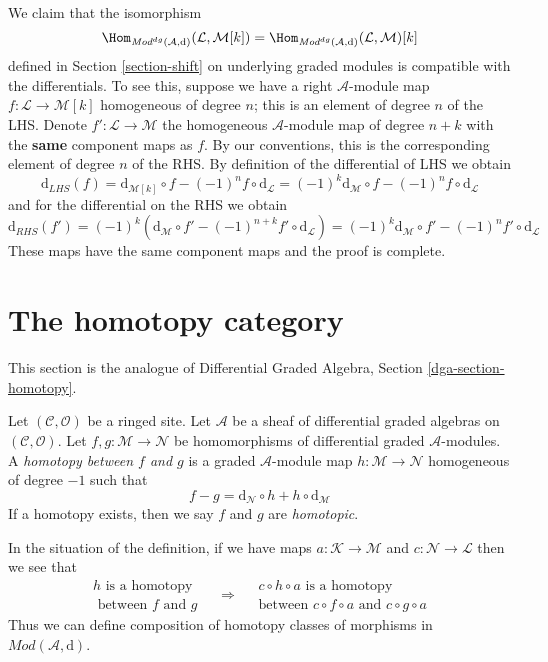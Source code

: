 \medskip\noindent
We claim that the isomorphism
$$
\Hom_{\textit{Mod}^{dg}(\mathcal{A}, \text{d})}(\mathcal{L}, \mathcal{M}[k])
=
\Hom_{\textit{Mod}^{dg}(\mathcal{A}, \text{d})}(\mathcal{L}, \mathcal{M})[k]
$$
defined in Section \ref{section-shift} on underlying graded modules
is compatible with
the differentials. To see this, suppose we have a right $\mathcal{A}$-module
map $f : \mathcal{L} \to \mathcal{M}[k]$ homogeneous of degree $n$; this
is an element of degree $n$ of the LHS. Denote
$f' : \mathcal{L} \to \mathcal{M}$ the homogeneous $\mathcal{A}$-module
map of degree $n + k$ with the {\bf same} component maps as $f$.
By our conventions, this is the corresponding element of degree $n$
of the RHS.
By definition of the differential of LHS we obtain
$$
\text{d}_{LHS}(f) =
\text{d}_{\mathcal{M}[k]} \circ f - (-1)^n f \circ \text{d}_\mathcal{L} =
(-1)^k\text{d}_\mathcal{M} \circ f - (-1)^n f \circ \text{d}_\mathcal{L}
$$
and for the differential on the RHS we obtain
$$
\text{d}_{RHS}(f') =
(-1)^k\left(
\text{d}_\mathcal{M} \circ f' - (-1)^{n + k} f' \circ \text{d}_\mathcal{L}
\right) =
(-1)^k\text{d}_\mathcal{M} \circ f' - (-1)^n f' \circ \text{d}_\mathcal{L}
$$
These maps have the same component maps and the proof is complete.










\section{The homotopy category}
\label{section-homotopy}

\noindent
This section is the analogue of
Differential Graded Algebra, Section \ref{dga-section-homotopy}.

\begin{definition}
\label{definition-homotopy}
Let $(\mathcal{C}, \mathcal{O})$ be a ringed site.
Let $\mathcal{A}$ be a sheaf of differential graded algebras
on $(\mathcal{C}, \mathcal{O})$. Let
$f, g : \mathcal{M} \to \mathcal{N}$
be homomorphisms of differential graded $\mathcal{A}$-modules.
A {\it homotopy between $f$ and $g$} is a graded $\mathcal{A}$-module
map $h : \mathcal{M} \to \mathcal{N}$ homogeneous of degree $-1$
such that
$$
f - g = \text{d}_\mathcal{N} \circ h + h \circ \text{d}_\mathcal{M}
$$
If a homotopy exists, then we say $f$ and $g$ are {\it homotopic}.
\end{definition}

\noindent
In the situation of the definition, if we have maps
$a : \mathcal{K} \to \mathcal{M}$ and $c : \mathcal{N} \to \mathcal{L}$
then we see that
$$
\begin{matrix}
h\text{ is a homotopy} \\
\text{ between }f\text{ and } g
\end{matrix}
\quad
\Rightarrow
\quad
\begin{matrix}
c \circ h \circ a\text{ is a homotopy}\\
\text{between }
c \circ f \circ a\text{ and } c\circ g \circ a
\end{matrix}
$$
Thus we can define composition of homotopy classes of morphisms
in $\textit{Mod}(\mathcal{A}, \text{d})$.

